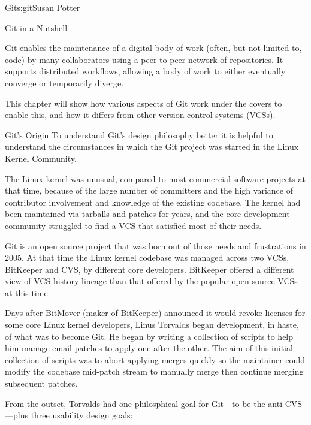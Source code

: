 \begin{aosachapter}{Git}{s:git}{Susan Potter}

\begin{aosasect1}{Git in a Nutshell}

Git enables the maintenance of a digital body of work (often, but not limited
to, code) by many collaborators using a peer-to-peer network of
repositories. It supports distributed workflows, allowing a
body of work to either eventually converge or temporarily diverge.

This chapter will show how various aspects of Git work under the covers
to enable this, and how it differs from other version control systems (VCSs).

\end{aosasect1}

\begin{aosasect1}{Git's Origin}
To understand Git's design philosophy better it is helpful to understand the
circumstances in which the Git project was started in the Linux Kernel
Community. 

The Linux kernel was unusual, compared to most commercial software projects at that
time, because of the large number of committers and the high variance of
contributor involvement and knowledge of the existing
codebase. 
The kernel had been maintained via tarballs and patches for years, and  
the core development community struggled to find a VCS that
satisfied most of their needs.

Git is an open source project that was born out of those needs and
frustrations in 2005. At that time
the Linux kernel codebase was managed across two VCSs, BitKeeper
and CVS, by different core developers. BitKeeper offered a different
view of VCS history lineage than that offered by the popular open source VCSs at this
time.

Days after BitMover (maker of BitKeeper) announced it would revoke licenses
for some core Linux kernel developers, Linus Torvalds began development, in
haste, of what was to become Git. He began by writing a
collection of scripts to help him manage email patches to apply one after
the other. The aim of this initial collection of scripts was to abort
applying merges quickly so the maintainer could modify the codebase
mid-patch stream to manually merge then continue merging subsequent patches.

From the outset, Torvalds had one philosphical goal for Git---to be the anti-CVS---plus
three usability design goals:


\end{aosasect1}
\end{aosachapter}
